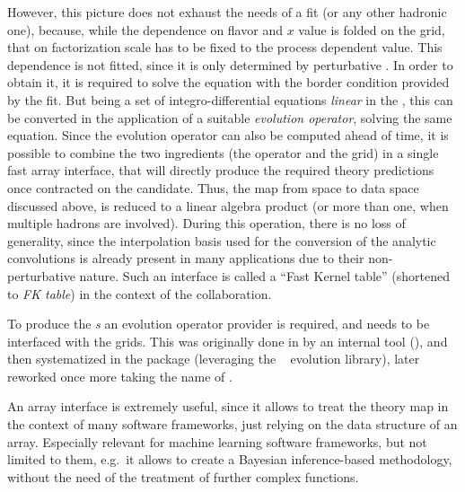 However, this picture does not exhaust the needs of a \pdf fit (or any other
hadronic one), because, while the \pdf dependence on flavor and $x$ value is
folded on the grid, that on factorization scale has to be fixed to the process
dependent value.
This dependence is not fitted, since it is only determined by perturbative
\qcd.
In order to obtain it, it is required to solve the \dglap equation with the
border condition provided by the fit.
But being \dglap a set of integro-differential equations \textit{linear} in the
\pdf, this can be converted in the application of a suitable \textit{evolution
operator}, solving the same equation.
Since the evolution operator can also be computed ahead of time, it is possible
to combine the two ingredients (the operator and the grid) in a single fast
array interface, that will directly produce the required theory predictions
once contracted on the \pdf candidate.
Thus, the map from \pdf space to data space discussed above, is reduced to a
linear algebra product (or more than one, when multiple hadrons are involved).
During this operation, there is no loss of generality, since the interpolation
basis used for the conversion of the analytic convolutions is already present
in many \pdf applications due to their non-perturbative nature.
Such an interface is called a \enquote{Fast Kernel table} (shortened to
\textit{FK table}) in the context of the \nnpdf collaboration.

To produce the \textit{\fktab{}s} an evolution operator provider is required,
and needs to be interfaced with the grids. This was originally done in \nnpdf
by an internal tool (\fkgen), and then systematized in the \apfelgrid
\cite{Bertone:2016lga} package (leveraging the \apfel~\cite{Bertone:2013vaa}
evolution library), later reworked once more taking the name of \apfelcomb
\cite{APFELcomb}.

An array interface is extremely useful, since it allows to treat the theory map
in the context of many software frameworks, just relying on the data structure
of an array. Especially relevant for machine
learning software frameworks, but not limited to them, e.g.\ it allows to
create a Bayesian inference-based methodology, without the need of the
treatment of further complex functions.

